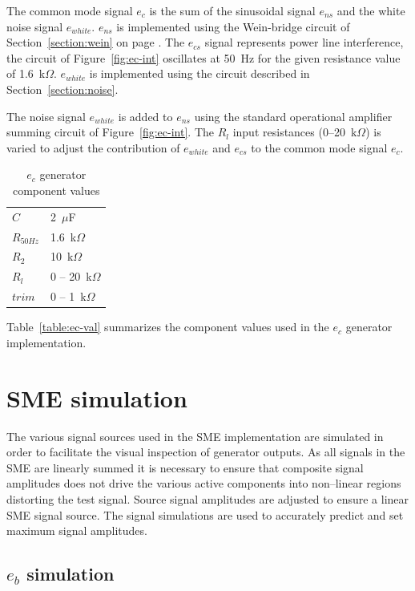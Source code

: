 The common mode signal $e_c$ is the sum of the sinusoidal signal
$e_{ns}$ and the white noise signal $e_{white}$. $e_{ns}$ is
implemented using the Wein-bridge circuit of
Section~\ref{section:wein} on page \pageref{section:wein}. The
$e_{cs}$ signal represents power line interference, the circuit of
Figure~\vref{fig:ec-int} oscillates at 50~Hz for the given resistance
value of 1.6~k$\Omega$.  $e_{white}$ is implemented using the circuit
described in Section~\ref{section:noise}.

The noise signal $e_{white}$ is added to $e_{ns}$ using the standard
operational amplifier summing circuit of Figure~\vref{fig:ec-int}. The
$R_l$ input resistances (0--20~k$\Omega$) is varied to adjust the
contribution of $e_{white}$ and $e_{cs}$ to the common mode signal
$e_c$.

\begin{table}
\begin{center}	
	\begin{tabular}[htpb]{|l|l|} \hline
	$C$ & 2~$\mu$F \\
	$R_{50Hz}$ & 1.6~k$\Omega$ \\
	$R_2$ & 10~k$\Omega$ \\
	$R_l$ & 0 -- 20~k$\Omega$ \\
	$trim$ & 0 -- 1~k$\Omega$ \\
	\hline
	\end{tabular}
	\caption{$e_c$ generator component values}
	\label{table:ec-val}
\end{center}	
\end{table}

Table~\vref{table:ec-val} summarizes the component values used in the
$e_c$ generator implementation.



\section{SME simulation}
The various signal sources used in the SME implementation are
simulated in order to facilitate the visual inspection of generator
outputs. As all signals in the SME are linearly summed it is necessary
to ensure that composite signal amplitudes does not drive the various
active components into non--linear regions distorting the test
signal. Source signal amplitudes are adjusted to ensure a linear SME
signal source. The signal simulations are used to accurately predict
and set maximum signal amplitudes.

\subsection{$e_b$ simulation}


